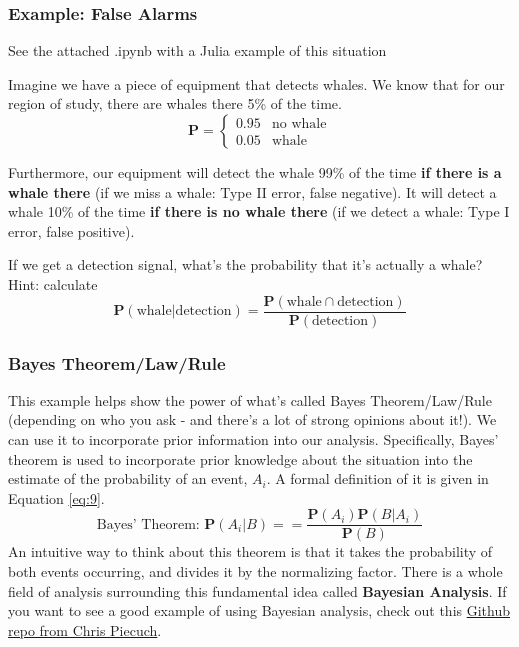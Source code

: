 \documentclass{article}
\begin{document}
\subsubsection{Example: False Alarms}
See the attached .ipynb with a Julia example of this situation

Imagine we have a piece of equipment that detects whales. We know that for our region of study, there are whales there 5\% of the time.
\begin{equation}
\label{eq:8}
\mathbf{P} = 
\begin{cases}
  0.95 & \text{no whale} \\
  0.05 & \text{whale}
 \end{cases}
\end{equation}

Furthermore, our equipment will detect the whale 99\% of the time \textbf{if there is a whale there} (if we miss a whale: Type II error, false negative). It will detect a whale 10\% of the time \textbf{if there is no whale there} (if we detect a whale: Type I error, false positive).

If we get a detection signal, what's the probability that it's actually a whale?
Hint: calculate
\begin{equation}
\label{eq:10}
\mathbf{P}(\text{whale} | \text{detection}) = \frac{\mathbf{P} (\text{whale} \cap \text{detection})}{\mathbf{P}(\text{detection})}
\end{equation}

\subsubsection{Bayes Theorem/Law/Rule}
This example helps show the power of what's called Bayes Theorem/Law/Rule (depending on who you ask - and there's a lot of strong opinions about it!). We can use it to incorporate prior information into our analysis. Specifically, Bayes' theorem is  used to incorporate prior knowledge about the situation into the estimate of the probability of an event, $A_i$. A formal definition of it is given in Equation \ref{eq:9}. 
\begin{equation}
\label{eq:9}
\text{Bayes' Theorem: }\mathbf{P} (A_i|B) ==\frac{\mathbf{P}(A_i)\mathbf{P}(B|A_i)}{\mathbf{P}(B)}
\end{equation}
An intuitive way to think about this theorem is that it takes the probability of both events occurring, and divides it by the normalizing factor. 
There is a whole field of analysis surrounding this fundamental idea called \textbf{Bayesian Analysis}. If you want to see a good example of using Bayesian analysis, check out this \href{https://github.com/christopherpiecuch/bevir}{Github repo from Chris Piecuch}.
\end{document}
